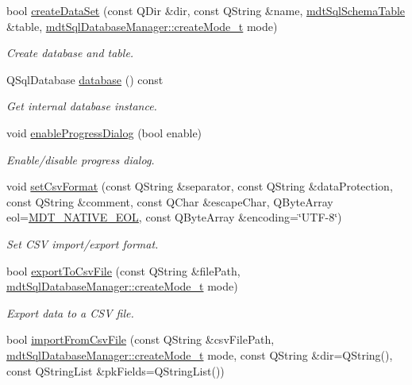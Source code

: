 \begin{DoxyCompactItemize}
bool \hyperlink{classmdt_data_table_manager_ae813c6c4323a1949d489a24c07e914fa}{create\-Data\-Set} (const Q\-Dir \&dir, const Q\-String \&name, \hyperlink{classmdt_sql_schema_table}{mdt\-Sql\-Schema\-Table} \&table, \hyperlink{classmdt_sql_database_manager_a2f5b46d67a88095053a5edfc415c7418}{mdt\-Sql\-Database\-Manager\-::create\-Mode\-\_\-t} mode)
\begin{DoxyCompactList}\small\item\em Create database and table. \end{DoxyCompactList}\item 
Q\-Sql\-Database \hyperlink{classmdt_data_table_manager_a9026c9d3d102246af243b68c815fba04}{database} () const 
\begin{DoxyCompactList}\small\item\em Get internal database instance. \end{DoxyCompactList}\item 
void \hyperlink{classmdt_data_table_manager_a139611cc21836438053226b1d7576201}{enable\-Progress\-Dialog} (bool enable)
\begin{DoxyCompactList}\small\item\em Enable/disable progress dialog. \end{DoxyCompactList}\item 
void \hyperlink{classmdt_data_table_manager_af14013b42dc0f84d37d4d1483f18d8c4}{set\-Csv\-Format} (const Q\-String \&separator, const Q\-String \&data\-Protection, const Q\-String \&comment, const Q\-Char \&escape\-Char, Q\-Byte\-Array eol=\hyperlink{mdt_csv_file_8h_af4d889780ff51b630e15bc9848df527c}{M\-D\-T\-\_\-\-N\-A\-T\-I\-V\-E\-\_\-\-E\-O\-L}, const Q\-Byte\-Array \&encoding=\char`\"{}U\-T\-F-\/8\char`\"{})
\begin{DoxyCompactList}\small\item\em Set C\-S\-V import/export format. \end{DoxyCompactList}\item 
bool \hyperlink{classmdt_data_table_manager_abe733f071ca77579522823598e79dd9a}{export\-To\-Csv\-File} (const Q\-String \&file\-Path, \hyperlink{classmdt_sql_database_manager_a2f5b46d67a88095053a5edfc415c7418}{mdt\-Sql\-Database\-Manager\-::create\-Mode\-\_\-t} mode)
\begin{DoxyCompactList}\small\item\em Export data to a C\-S\-V file. \end{DoxyCompactList}\item 
bool \hyperlink{classmdt_data_table_manager_a668cc3d94e6aa5dab406a0fd319351af}{import\-From\-Csv\-File} (const Q\-String \&csv\-File\-Path, \hyperlink{classmdt_sql_database_manager_a2f5b46d67a88095053a5edfc415c7418}{mdt\-Sql\-Database\-Manager\-::create\-Mode\-\_\-t} mode, const Q\-String \&dir=Q\-String(), const Q\-String\-List \&pk\-Fields=Q\-String\-List())

\end{DoxyCompactItemize}
